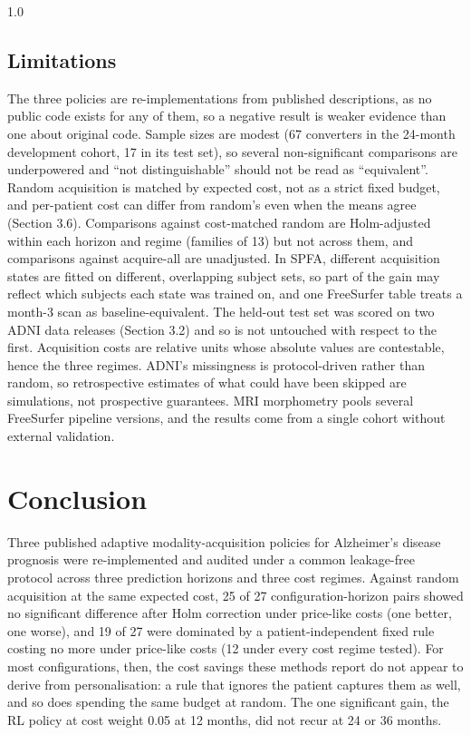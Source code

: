 \documentclass[12pt,twoside]{article}
\begin{document}
\begin{spacing}{1.0}
\subsection{Limitations}
The three policies are re-implementations from published descriptions, as no public code exists for any of
them, so a negative result is weaker evidence than one about original code. Sample sizes are modest (67
converters in the 24-month development cohort, 17 in its test set), so several non-significant comparisons are
underpowered and ``not distinguishable'' should not be read as ``equivalent''. Random acquisition is matched by
expected cost, not as a strict fixed budget, and per-patient cost can differ from random's even when the means
agree (Section 3.6). Comparisons against cost-matched random are Holm-adjusted within each horizon and regime
(families of 13) but not across them, and comparisons against acquire-all are unadjusted. In SPFA, different
acquisition states are fitted on different, overlapping subject sets, so part of the gain may reflect which
subjects each state was trained on, and one FreeSurfer table treats a month-3 scan as baseline-equivalent. The
held-out test set was scored on two ADNI data releases (Section 3.2) and so is not untouched with respect to
the first. Acquisition costs are relative units whose absolute values are contestable, hence the three
regimes. ADNI's missingness is protocol-driven rather than random, so retrospective estimates of what could
have been skipped are simulations, not prospective guarantees. MRI morphometry pools several FreeSurfer
pipeline versions, and the results come from a single cohort without external validation.

\section{Conclusion}
Three published adaptive modality-acquisition policies for Alzheimer's
disease prognosis were re-implemented and audited under a common
leakage-free protocol across three prediction horizons and three cost
regimes. Against random acquisition at the same expected cost, 25 of 27
configuration-horizon pairs showed no significant difference after Holm
correction under price-like costs (one better, one worse), and 19 of 27 were dominated by a
patient-independent fixed rule costing no more under price-like costs (12
under every cost regime tested). For most configurations, then, the cost
savings these methods report do not appear to derive from personalisation: a
rule that ignores the patient captures them as well, and so does spending the
same budget at random. The one significant gain, the RL policy at cost weight
0.05 at 12 months, did not recur at 24 or 36 months.


\end{spacing}
\end{document}

